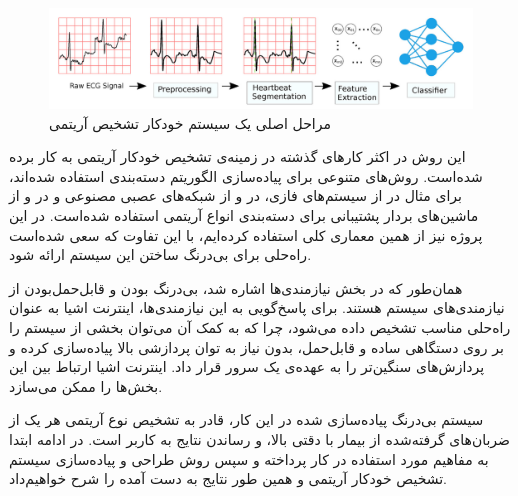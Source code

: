 \begin{figure}[!htb]
\centering
\includegraphics[width=15cm]{Figures/classifier.png}
\caption{مراحل اصلی یک سیستم خودکار تشخیص آریتمی\cite{Mondejar}}
\label{fig:classifierPicture}
\end{figure}
این روش در اکثر کارهای گذشته در زمینه‌ی تشخیص خودکار آریتمی به کار برده شده‌است. روش‌های متنوعی برای پیاده‌سازی الگوریتم دسته‌بندی استفاده شده‌اند، برای مثال در \cite{Exarchos2007} از سیستم‌های فازی، در \cite{deChazal2004} و \cite{Llamedo2011} از شبکه‌‌های عصبی مصنوعی و در \cite{Zhang2005} و \cite{Bazi2013} از ماشین‌های بردار پشتیبانی برای دسته‌بندی انواع آریتمی استفاده شده‌است. در این پروژه نیز از همین معماری کلی استفاده کرده‌ایم، با این تفاوت که سعی شده‌است راه‌حلی برای بی‌درنگ ساختن این سیستم ارائه شود. 

همان‌طور که در بخش نیازمندی‌ها اشاره شد، بی‌درنگ بودن و قابل‌حمل‌بودن از نیازمندی‌های سیستم هستند. برای پاسخ‌گویی به این نیازمندی‌ها، اینترنت اشیا به عنوان راه‌حلی مناسب تشخیص‌ داده می‌شود، چرا که به کمک آن می‌توان بخشی از سیستم را بر روی دستگاهی ساده و قابل‌حمل، بدون نیاز به توان پردازشی بالا پیاده‌سازی کرده و پردازش‌های سنگین‌تر را به عهده‌ی یک سرور قرار داد. اینترنت اشیا ارتباط بین این بخش‌ها را ممکن می‌سازد.

سیستم بی‌درنگ پیاده‌سازی شده در این کار،  قادر به تشخیص نوع آریتمی هر یک از ضربان‌های گرفته‌شده از بیمار با دقتی بالا، و رساندن نتایج به کاربر است. در ادامه ابتدا به مفاهیم مورد استفاده در کار پرداخته و سپس روش طراحی و پیاده‌سازی سیستم تشخیص خودکار آریتمی و همین طور نتایج به دست آمده را شرح خواهیم‌داد. 


